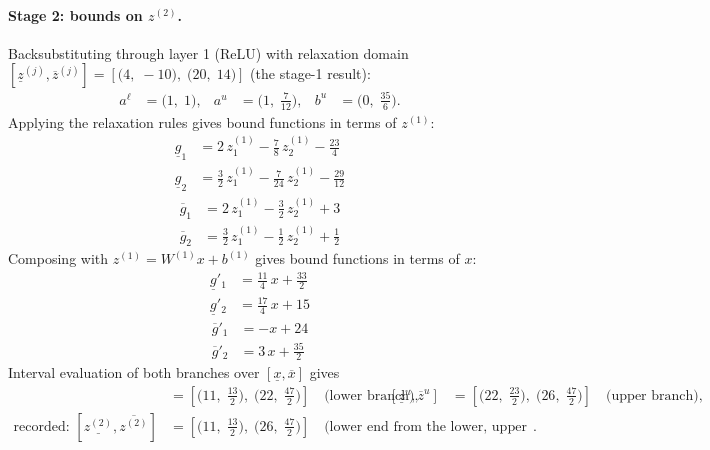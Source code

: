 \documentclass[11pt]{article}
\begin{document}
\paragraph{Stage 2: bounds on $z^{(2)}$.}
Backsubstituting through layer 1 (ReLU) with relaxation domain $[\underline{z}^{(j)}, \overline{z}^{(j)}] = [\bigl(4,\; -10\bigr),\; \bigl(20,\; 14\bigr)]$ (the stage-1 result):
\begin{align*}
a^{\ell} &= \bigl(1,\; 1\bigr), & a^{u} &= \bigl(1,\; \frac{7}{12}\bigr), & b^{u} &= \bigl(0,\; \frac{35}{6}\bigr).
\end{align*}
Applying the relaxation rules gives bound functions in terms of $z^{(1)}$:
\begin{align*}
\underline{g}_{1} &= 2\,z^{(1)}_{1} - \frac{7}{8}\,z^{(1)}_{2} - \frac{23}{4} \\
\underline{g}_{2} &= \frac{3}{2}\,z^{(1)}_{1} - \frac{7}{24}\,z^{(1)}_{2} - \frac{29}{12}
\end{align*}
\begin{align*}
\overline{g}_{1} &= 2\,z^{(1)}_{1} - \frac{3}{2}\,z^{(1)}_{2} + 3 \\
\overline{g}_{2} &= \frac{3}{2}\,z^{(1)}_{1} - \frac{1}{2}\,z^{(1)}_{2} + \frac{1}{2}
\end{align*}
Composing with $z^{(1)} = W^{(1)} x + b^{(1)}$ gives bound functions in terms of $x$:
\begin{align*}
\underline{g}'_{1} &= \frac{11}{4}\,x + \frac{33}{2} \\
\underline{g}'_{2} &= \frac{17}{4}\,x + 15
\end{align*}
\begin{align*}
\overline{g}'_{1} &= -x + 24 \\
\overline{g}'_{2} &= 3\,x + \frac{35}{2}
\end{align*}
Interval evaluation of both branches over $[\underline{x}, \overline{x}]$ gives
\begin{align*}
[\underline{z}^{\ell}, \overline{z}^{\ell}] &= [\bigl(11,\; \frac{13}{2}\bigr),\; \bigl(22,\; \frac{47}{2}\bigr)] \quad\text{(lower branch)}, & [\underline{z}^{u}, \overline{z}^{u}] &= [\bigl(22,\; \frac{23}{2}\bigr),\; \bigl(26,\; \frac{47}{2}\bigr)] \quad\text{(upper branch)}, \\
\text{recorded: } [\underline{z^{(2)}}, \overline{z^{(2)}}] &= [\bigl(11,\; \frac{13}{2}\bigr),\; \bigl(26,\; \frac{47}{2}\bigr)] \quad\text{(lower end from the lower, upper end from the upper branch)}.
\end{align*}
\end{document}
